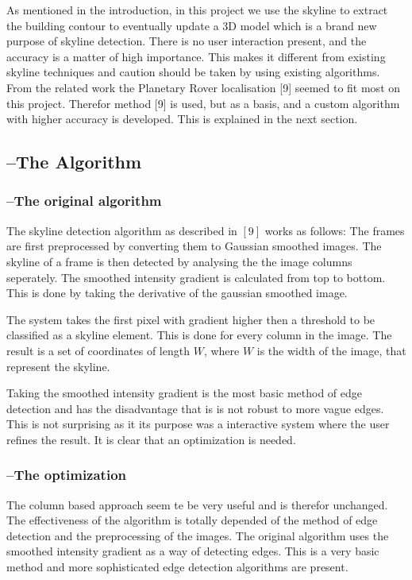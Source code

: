 \documentclass[10pt]{article}
\begin{document}
As mentioned in the introduction, in this project we use the skyline to extract
the building contour to eventually update a 3D model which is a brand new
purpose of skyline detection.  There is no user interaction present, and the
accuracy is a matter of high importance.  This makes it different from existing
skyline techniques and caution should be taken by using existing algorithms.
From the related work the Planetary Rover localisation [9] seemed to fit most on
this project.  Therefor method [9] is used, but as a basis, and a custom
algorithm with higher accuracy is developed. This is explained in the next
section.



 \subsection{--The Algorithm}
 \subsubsection{--The original algorithm}
The skyline detection algorithm as described in $[9]$ works as follows:
The frames are first preprocessed by converting them to Gaussian smoothed images.
The skyline of a frame is then detected by analysing the the image columns
seperately.
The smoothed intensity gradient is calculated from top to bottom. This is done
by taking the derivative of the gaussian smoothed image.

The system takes the first pixel with gradient higher then a threshold to be
classified as a skyline element.  This is done for every column in the image.
The result is a set of coordinates of length $W$,
where $W$ is the width of the image, that represent the skyline.

Taking the smoothed intensity gradient is the most basic method of edge
detection and has the disadvantage that is is not robust to more vague
edges. This is not surprising as it its purpose was a interactive system where the
user refines the result. It is clear that an optimization is needed.

  \subsubsection{--The optimization}
The column based approach seem te be very useful and is therefor unchanged. 
The effectiveness of the algorithm is totally depended of the method of edge
detection and the preprocessing of the images. 
The original algorithm uses the smoothed intensity gradient as a way of
detecting edges. This is a very basic method and more sophisticated edge
detection algorithms are present.\\
\end{document}
